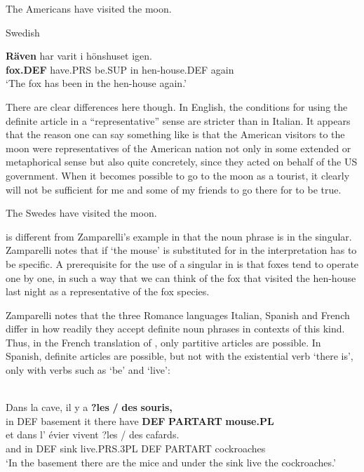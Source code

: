\ea
	\gl \label{bkm:Ref69031158}The Americans have visited the moon.  
\z

\ea 
\gl \label{bkm:Ref77501116}Swedish
\z
 
\ea\label{}
\gll \textbf{Räven} har  varit  i  hönshuset  igen.\\
\textbf{fox.DEF} have.PRS  be.SUP  in  hen-house.DEF  again\\
\glt ‘The fox has been in the hen-house again.’

\z

There are clear differences here though. In English, the conditions for using the definite article in a “representative” sense are stricter than in Italian. It appears that the reason one can say something like  is that the American visitors to the moon were representatives of the American nation not only in some extended or metaphorical sense but also quite concretely, since they acted on behalf of the US government. When it becomes possible to go to the moon as a tourist, it clearly will not be sufficient for me and some of my friends to go there for  to be true.

\ea
\gl \label{bkm:Ref94431191}The Swedes have visited the moon.  
 \z

	  is different from Zamparelli’s example in that the noun phrase is in the singular. Zamparelli notes that if  ‘the mouse’ is substituted for in \textstyleLinguisticExample{, }the interpretation has to be specific. A prerequisite for the use of a singular in  is that foxes tend to operate one by one, in such a way that we can think of the fox that visited the hen-house last night as a representative of the fox species. 

Zamparelli notes that the three Romance languages Italian, Spanish and French differ in how readily they accept definite noun phrases in contexts of this kind. Thus, in the French translation of , only partitive articles are possible. In Spanish, definite articles are possible, but not with the existential verb  ‘there is’, only with verbs such as  ‘be’ and  ‘live’:

\ea \label{} 
\\
\gll Dans  la  cave,  il  y  a  \textbf{?les} \textbf{/} \textbf{des} \textbf{souris,}\\
in  DEF  basement  it  there  have  \textbf{DEF}  \textbf{PARTART} \textbf{mouse.PL}\\
\gll et  dans  l’  évier  vivent  ?les  /  des  cafards.\\
and  in  DEF  sink  live.PRS.3PL  DEF    PARTART  cockroaches\\
\glt ‘In the basement there are the mice and under the sink live the cockroaches.’ 

